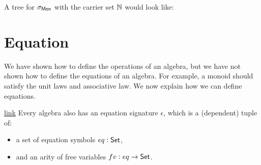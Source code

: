 \begin{example}
A tree for $\sigma_{\mathsf{Mon}}$ with the carrier set $\mathbb{N}$ would look like:
\begin{center}
\hspace{2em}
\end{center}
\end{example}

\section{Equation}\label{sec:universal-algebra:equations}
We have shown how to define the operations of an algebra, but we have not
shown how to define the equations of an algebra. For example, a monoid
should satisfy the unit laws and associative law. We now explain how
we can define equations.

\begin{definition}{\href{https://windtfw.com/agda-symmetries/Cubical.Structures.Eq.html#678}{link}}
Every algebra also has an equation signature
$\epsilon$, which is a (dependent) tuple of:
\begin{itemize}
    \item a set of equation symbols $eq : \mathsf{Set}$,
    \item and an arity of free variables $fv : eq \to \mathsf{Set}$.
\end{itemize}
\end{definition}

